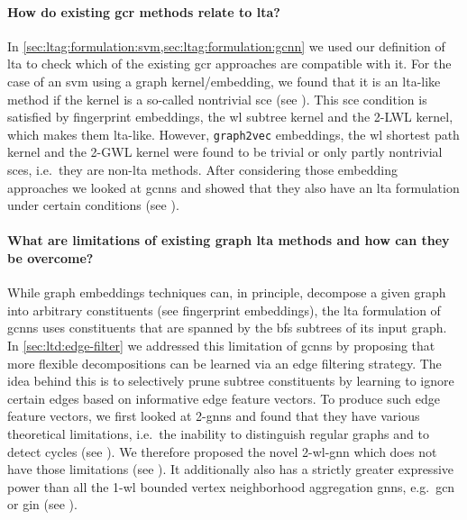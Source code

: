 \paragraph{\; How do existing \ac{gcr} methods relate to \ac{lta}?}
In \cref{sec:ltag:formulation:svm,sec:ltag:formulation:gcnn} we used our definition of \ac{lta} to check which of the existing \ac{gcr} approaches are compatible with it.
For the case of an \ac{svm} using a graph kernel/embedding, we found that it is an \acs{lta}-like method if the kernel is a so-called nontrivial \acf{sce} (see ).
This \ac{sce} condition is satisfied by fingerprint embeddings, the \ac{wl} subtree kernel and the 2-LWL kernel, which makes them \acs{lta}-like.
However, \texttt{graph2vec} embeddings, the \ac{wl} shortest path kernel and the 2-GWL kernel were found to be trivial or only partly nontrivial \acp{sce}, i.e.\ they are non-\acs{lta} methods.
After considering those embedding approaches we looked at \acp{gcnn} and showed that they also have an \ac{lta} formulation under certain conditions (see ).

\paragraph{\; What are limitations of existing graph \ac{lta} methods and how can they be overcome?}
While graph embeddings techniques can, in principle, decompose a given graph into arbitrary constituents (see fingerprint embeddings), the \ac{lta} formulation of \acp{gcnn} uses constituents that are spanned by the \ac{bfs} subtrees of its input graph.
In \cref{sec:ltd:edge-filter} we addressed this limitation of \acp{gcnn} by proposing that more flexible decompositions can be learned via an edge filtering strategy.
The idea behind this is to selectively prune subtree constituents by learning to ignore certain edges based on informative edge feature vectors.
To produce such edge feature vectors, we first looked at 2-\acsp{gnn} and found that they have various theoretical limitations, i.e.\ the inability to distinguish regular graphs and to detect cycles (see ).
We therefore proposed the novel 2-\acs{wl}-\acs{gnn} which does not have those limitations (see ).
It additionally also has a strictly greater expressive power than all the 1-\acs{wl} bounded vertex neighborhood aggregation \acp{gnn}, e.g.\ \ac{gcn} or \ac{gin} (see ).

